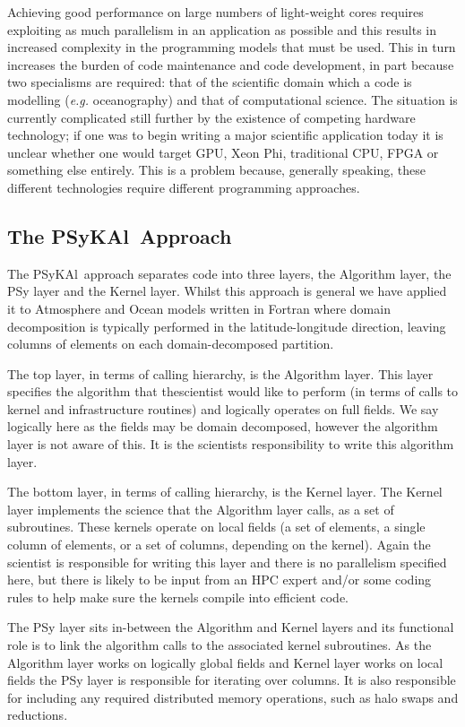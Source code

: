 \documentclass{IOS-Book-Article}
\newcommand{\psykal}{{PS}y{KA}l\ }
\begin{document}
Achieving good performance on large numbers of light-weight cores
requires exploiting as much parallelism in an application as possible
and this results in increased complexity in the programming models
that must be used. This in turn increases the burden of code
maintenance and code development, in part because two specialisms are
required: that of the scientific domain which a code is modelling
({\it e.g.} oceanography) and that of computational science. The
situation is currently complicated still further by the existence of
competing hardware technology; if one was to begin writing a major
scientific application today it is unclear whether one would target
GPU, Xeon Phi, traditional CPU, FPGA or something else entirely. This
is a problem because, generally speaking, these different technologies
require different programming approaches.

\subsection{The \psykal Approach}

The \psykal approach separates code into three layers, the Algorithm
layer, the PSy layer and the Kernel layer. Whilst this approach is
general we have applied it to Atmosphere and Ocean models written in
Fortran where domain decomposition is typically performed in the
latitude-longitude direction, leaving columns of elements on each
domain-decomposed partition.

The top layer, in terms of calling hierarchy, is the Algorithm
layer. This layer specifies the algorithm that thescientist would like
to perform (in terms of calls to kernel and infrastructure routines)
and logically operates on full fields. We say logically here as the
fields may be domain decomposed, however the algorithm layer is not
aware of this. It is the scientists responsibility to write this
algorithm layer.

The bottom layer, in terms of calling hierarchy, is the Kernel
layer. The Kernel layer implements the science that the Algorithm
layer calls, as a set of subroutines. These kernels operate on local
fields (a set of elements, a single column of elements, or a set of
columns, depending on the kernel). Again the scientist is responsible
for writing this layer and there is no parallelism specified here, but
there is likely to be input from an HPC expert and/or some coding
rules to help make sure the kernels compile into efficient code.

The PSy layer sits in-between the Algorithm and Kernel layers and its
functional role is to link the algorithm calls to the associated
kernel subroutines. As the Algorithm layer works on logically global
fields and Kernel layer works on local fields the PSy layer is
responsible for iterating over columns. It is also responsible for
including any required distributed memory operations, such as halo
swaps and reductions.
\end{document}
